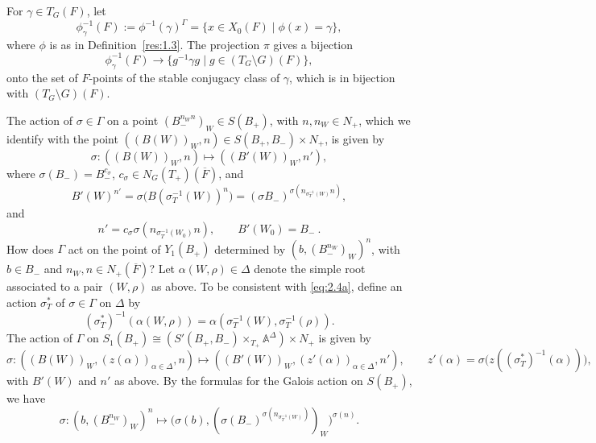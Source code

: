 \documentclass[12pt,letterpaper]{amsart}
\theoremstyle{plain}
\theoremstyle{definition}
\theoremstyle{remark}
\theoremstyle{definition}
\newcommand{\ovF}{\overline{F}}
\newcommand{\aaa}{\mathbb{A}}
\begin{document}
For $\gamma\in T_G(F)$, let
\[
\phi_\gamma^{-1}(F):=\phi^{-1}(\gamma)^\Gamma=
\{x\in X_0(F) \mid \phi(x)=\gamma\},
\]
where $\phi$ is as in Definition~\ref{res:1.3}.
The projection $\pi$ gives a bijection
\begin{equation}\tag{2.3}\label{eq:2.3}
\phi_\gamma^{-1}(F)
\rightarrow \{g^{-1}\gamma g \mid g\in (T_G\setminus G)(F)\},
\end{equation}
onto the set of $F$-points of the stable conjugacy class of $\gamma$, which
is in bijection with $(T_G\setminus G)(F)$.

The action of $\sigma\in\Gamma$ on a point
$(B_-^{n_Wn})_{W}\in S(B_+)$, with
$n,n_W\in N_+$, which we identify with the point
$((B(W))_{W},n)\in S(B_+,B_-)\times N_+$,
is given by
\begin{equation}\tag{2.4a}\label{eq:2.4a}
\sigma: ((B(W))_{W},n)\longmapsto
((B'(W))_{W},n'),
\end{equation}
where $\sigma(B_-)=B_-^{c_\sigma}$,
$c_\sigma\in N_G(T_+)(\ovF)$, and
\begin{equation}\tag{2.4b}\label{eq:2.4b}
B'(W)^{n'}=\sigma\big(B(\sigma_T^{-1}(W))^n\big)=
(\sigma B_-)^{\sigma(n_{\sigma_T^{-1}(W)}n)},
\end{equation}
and
\begin{equation}\tag{2.4c}\label{eq:2.4c}
n'=c_\sigma\sigma(n_{\sigma_T^{-1}(W_0)}n),\qquad B'(W_0)= B_- \ .
\end{equation}
How does $\Gamma$ act on the point of $Y_1(B_+)$
determined by $(b,(B_-^{n_W})_{W})^{n}$, with
$b\in B_-$ and $n_W,n\in N_+(\ovF)$?
Let $\alpha(W,\rho)\in\Delta$ denote the simple root associated to
a pair $(W,\rho)$ as above.
To be consistent with \eqref{eq:2.4a}, define an action $\sigma_T^*$ of
$\sigma\in\Gamma$ on $\Delta$ by
\begin{equation}\tag{2.5}\label{eq:2.5}
(\sigma_T^*)^{-1}(\alpha(W,\rho))
=\alpha(\sigma_T^{-1}(W),\sigma_T^{-1}(\rho)).
\end{equation}
The action of $\Gamma$ on
$S_1(B_+)\cong (S'(B_+,B_-)\times_{T_+}\aaa^\Delta)\times N_+$
is given by
\[
\sigma:((B(W))_{W},(z(\alpha))_{\alpha\in \Delta},n)\longmapsto
((B'(W))_{W},(z'(\alpha))_{\alpha\in \Delta},n'),
\qquad
z'(\alpha)=\sigma\big(z((\sigma_T^*)^{-1}(\alpha))\big),
\]
with $B'(W)$ and $n'$ as above. By the formulas
for the Galois action on $S(B_+)$, we have
\begin{equation}\tag{2.6}\label{eq:2.6}
\sigma:(b,(B_-^{n_W})_{W})^{n}\longmapsto
\big(\sigma (b),(\sigma(B_-)^{\sigma (n_{\sigma^{-1}_T (W)})}
)_{W}\big)^{\sigma(n)}.
\end{equation}
\end{document}
